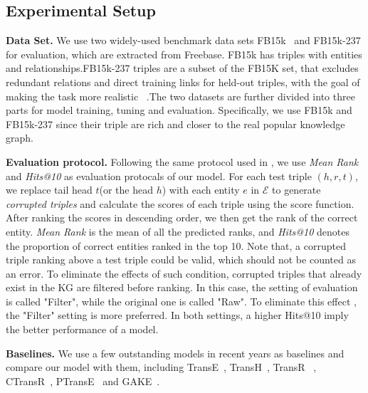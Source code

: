 \subsection{Experimental Setup}

\textbf{\indent Data Set.}
We use two widely-used benchmark data sets FB15k~\cite{BordesUGWY13} and FB15k-237 for evaluation, which are extracted from Freebase. FB15k has  triples with  entities and  relationships.FB15k-237 triples are a subset of the FB15K set, that excludes redundant relations and direct training links for held-out triples, with the goal of making the task more realistic ~\cite{Toutanova15}.The two datasets are further divided into three parts for model training, tuning and evaluation. Specifically, we use FB15k and FB15k-237 since their triple are rich and closer to the real popular knowledge graph.

\textbf{Evaluation protocol.}
Following the same protocol used in \cite{BordesUGWY13}, we use \textit{Mean Rank} and \textit{Hits@10} as evaluation protocals of our model. For each test triple $(h,r,t)$, we replace tail head $t$(or the head $h$) with each entity $e$ in $\mathcal{E}$ to generate \emph{corrupted triples} and calculate the scores of each triple using the score function. After ranking the scores in descending order, we then get the rank of the correct entity. \textit{Mean Rank} is the mean of all the predicted ranks, and \textit{Hits@10} denotes the proportion of correct entities ranked in the top 10. Note that, a corrupted triple ranking above a test triple could be valid, which should not be counted as an error. To eliminate the effects of such condition, corrupted triples that already exist in the KG are filtered before ranking. In this case, the setting of evaluation is called "Filter", while the original one is called "Raw". To eliminate this effect , the "Filter" setting is more preferred. In both settings, a higher Hits@10 imply the better performance of a model.

\textbf{Baselines.}
We use a few outstanding models in recent years as baselines and compare our model with them, including TransE~\cite{BordesUGWY13}, TransH~\cite{WangZFC14}, TransR~\cite{LinLSLZ15} , CTransR~\cite{LinLSLZ15}, PTransE~\cite{LinLLSRL15} and GAKE~\cite{FengHYZ16}.

